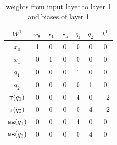 \documentclass{beamer}
\newcommand{\h}{_\text{h}}
\newcommand{\shortTos}{\textsc{\texttt{t}}}
\newcommand{\shortNonempty}{\textsc{\texttt{ne}}}
\begin{document}
\begin{frame}
	\begin{table}
		\centering
		\begin{tabular}{|c| c c c c c |c|}
			\hline 
			$W^1$ 				 &$x_0$&$x_1$&$x\h$&$q_1$&$q_2$ &$b^1$\\
			\hline
			$x_0$ 				 &1    &0    &0    &0    &0 	  &0\\
			$x_1$ 				 &0    &1    &0    &0    &0 	  &0\\
			$q_1$ 				 &0    &0    &0    &1    &0 	  &0\\
			$q_2$ 				 &0    &0    &0    &0    &1 	  &0\\
			$\shortTos(q_1)$ 	 &0    &0    &0    &4    &0 	  &$-2$\\
			$\shortTos(q_2)$ 	 &0    &0    &0    &0    &4 	  &$-2$\\
			$\shortNonempty(q_1)$&0    &0    &0    &4    &0 	  &0\\
			$\shortNonempty(q_2)$&0    &0    &0    &0    &4 	  &0\\
			\hline
		\end{tabular}
		\caption{weights from input layer to layer 1 and biases of layer 1}
	\end{table}
\end{frame}
\end{document}
